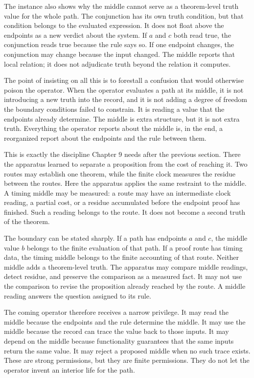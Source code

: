 The instance also shows why the middle cannot serve as a theorem-level truth
value for the whole path. The conjunction has its own truth condition, but that
condition belongs to the evaluated expression. It does not float above the
endpoints as a new verdict about the system. If \(a\) and \(c\) both read true,
the conjunction reads true because the rule says so. If one endpoint changes,
the conjunction may change because the input changed. The middle reports that
local relation; it does not adjudicate truth beyond the relation it computes.

The point of insisting on all this is to forestall a confusion that would
otherwise poison the operator. When the operator evaluates a path at its middle,
it is not introducing a new truth into the record, and it is not adding a degree
of freedom the boundary conditions failed to constrain. It is reading a value that
the endpoints already determine. The middle is extra structure, but it is not
extra truth. Everything the operator reports about the middle is, in the end, a
reorganized report about the endpoints and the rule between them.

This is exactly the discipline Chapter 9 needs after the previous section. There
the apparatus learned to separate a proposition from the cost of reaching it.
Two routes may establish one theorem, while the finite clock measures the
residue between the routes. Here the apparatus applies the same restraint to the
middle. A timing middle may be measured: a route may have an intermediate clock
reading, a partial cost, or a residue accumulated before the endpoint proof has
finished. Such a reading belongs to the route. It does not become a second truth
of the theorem.

The boundary can be stated sharply. If a path has endpoints \(a\) and \(c\), the
middle value \(b\) belongs to the finite evaluation of that path. If a proof route
has timing data, the timing middle belongs to the finite accounting of that
route. Neither middle adds a theorem-level truth. The apparatus may compare
middle readings, detect residue, and preserve the comparison as a measured fact.
It may not use the comparison to revise the proposition already reached by the
route. A middle reading answers the question assigned to its rule.

The coming operator therefore receives a narrow privilege. It may read the
middle because the endpoints and the rule determine the middle. It may use the
middle because the record can trace the value back to those inputs. It may depend
on the middle because functionality guarantees that the same inputs return the
same value. It may reject a proposed middle when no such trace exists. These are
strong permissions, but they are finite permissions. They do not let the operator
invent an interior life for the path.

